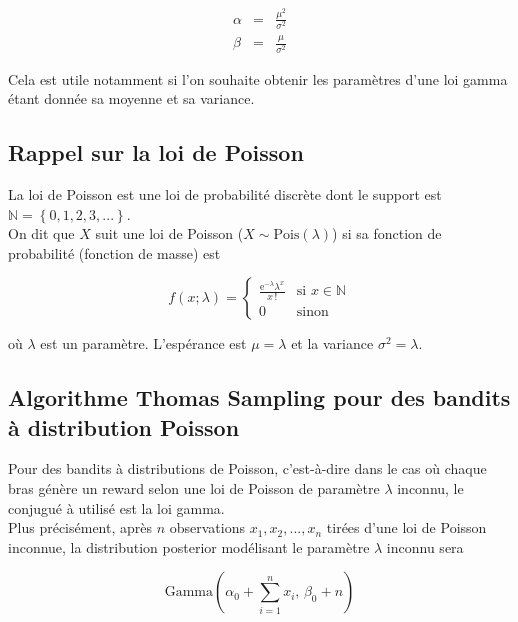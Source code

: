 \documentclass[letterpaper,11pt]{article}
\renewcommand{\exp}[1]{\mathrm{e}^{#1}}
\begin{document}
\begin{eqnarray}
\alpha   &=& \frac{\mu^2}{\sigma^2} \label{equation: alpha gamma}\\
\beta &=& \frac{\mu}{\sigma^2} \label{equation: beta gamma}
\end{eqnarray}

Cela est utile notamment si l'on souhaite obtenir les paramètres d'une loi gamma étant donnée sa moyenne et sa variance.

\subsection{Rappel sur la loi de Poisson}

La loi de Poisson est une loi de probabilité discrète dont le support est $\mathbb{N}=\left\{0,1,2,3,...\right\}.$\\
On dit que $X$ suit une loi de Poisson ($X\sim\mathrm{Pois}(\lambda)$) si sa fonction de probabilité (fonction de masse) est

\begin{equation*}
f(x; \lambda) = 
\left\{
\begin{array}{cl}
\frac{\exp{-\lambda} \lambda^x}{x\,!} & \text{si } x\in\mathbb{N}\\[0.4cm]
0 & \text{sinon}
\end{array}
\right.
\end{equation*}

où $\lambda$ est un paramètre. L'espérance est $\mu=\lambda$ et la variance $\sigma^2=\lambda.$

\subsection{Algorithme Thomas Sampling pour des bandits à distribution Poisson }

Pour des bandits à distributions de Poisson, c'est-à-dire dans le cas où chaque bras génère un reward selon une loi de Poisson de paramètre $\lambda$ inconnu, le conjugué à utilisé est la loi gamma.\\

Plus précisément, après $n$ observations $x_1,x_2,...,x_n$ tirées d'une loi de Poisson inconnue, la distribution posterior modélisant le paramètre $\lambda$ inconnu sera

\begin{equation}
\mathrm{Gamma}\left(\alpha_0 + \sum_{i=1}^n x_i,\,\beta_0 + n\right)
\end{equation}
\end{document}
